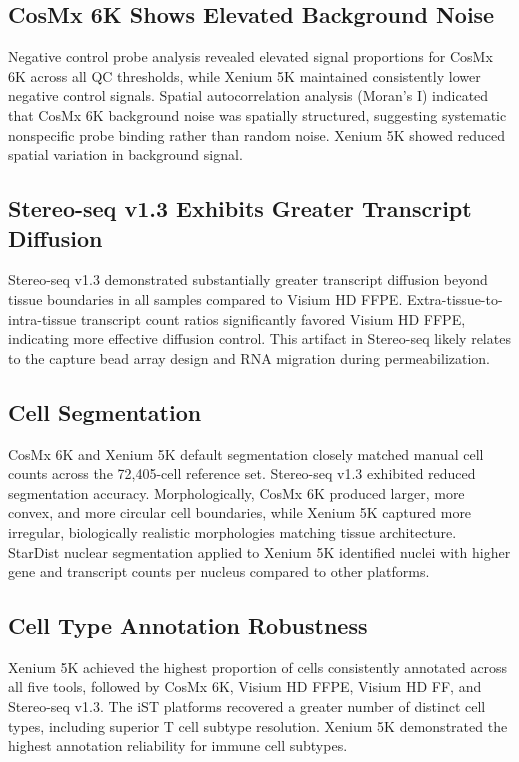 \documentclass[11pt]{article}
\begin{document}
\subsection{CosMx 6K Shows Elevated Background Noise}
Negative control probe analysis revealed elevated signal proportions for CosMx 6K across all QC thresholds, while Xenium 5K maintained consistently lower negative control signals. Spatial autocorrelation analysis (Moran's I) indicated that CosMx 6K background noise was spatially structured, suggesting systematic nonspecific probe binding rather than random noise. Xenium 5K showed reduced spatial variation in background signal.

\subsection{Stereo-seq v1.3 Exhibits Greater Transcript Diffusion}
Stereo-seq v1.3 demonstrated substantially greater transcript diffusion beyond tissue boundaries in all samples compared to Visium HD FFPE. Extra-tissue-to-intra-tissue transcript count ratios significantly favored Visium HD FFPE, indicating more effective diffusion control. This artifact in Stereo-seq likely relates to the capture bead array design and RNA migration during permeabilization.

\subsection{Cell Segmentation}
CosMx 6K and Xenium 5K default segmentation closely matched manual cell counts across the 72,405-cell reference set. Stereo-seq v1.3 exhibited reduced segmentation accuracy. Morphologically, CosMx 6K produced larger, more convex, and more circular cell boundaries, while Xenium 5K captured more irregular, biologically realistic morphologies matching tissue architecture. StarDist nuclear segmentation applied to Xenium 5K identified nuclei with higher gene and transcript counts per nucleus compared to other platforms.

\subsection{Cell Type Annotation Robustness}
Xenium 5K achieved the highest proportion of cells consistently annotated across all five tools, followed by CosMx 6K, Visium HD FFPE, Visium HD FF, and Stereo-seq v1.3. The iST platforms recovered a greater number of distinct cell types, including superior T cell subtype resolution. Xenium 5K demonstrated the highest annotation reliability for immune cell subtypes.
\end{document}

